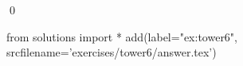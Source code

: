 
\begin{ex} 
  \label{ex:tower6}
  
  \qed
\end{ex} 
\begin{python0}
from solutions import *
add(label="ex:tower6",
    srcfilename='exercises/tower6/answer.tex') 
\end{python0}
